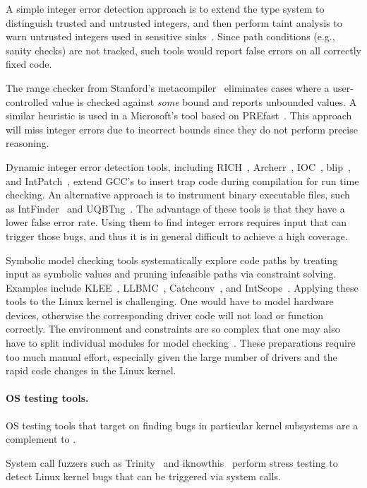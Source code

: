 A simple integer error detection approach is to extend the type
system to distinguish trusted and untrusted integers, and then
perform taint analysis to warn untrusted integers used in sensitive
sinks~\cite{cqual, lclint}.  Since path conditions (e.g., sanity
checks) are not tracked, such tools would report false errors on
all correctly fixed code.

The range checker from Stanford's metacompiler~\cite{range-checker}
eliminates cases where a user-controlled value is checked against
\emph{some} bound and reports unbounded values.  A similar heuristic
is used in a Microsoft's tool based on PREfast~\cite{prefast}.  This
approach will miss integer errors due to incorrect bounds since
they do not perform precise reasoning.

Dynamic integer error detection tools,
including
RICH~\cite{brumley:rich},
Archerr~\cite{archerr},
IOC~\cite{ioc},
blip~\cite{blip},
and
IntPatch~\cite{intpatch},
extend GCC's  to insert trap code during compilation for
run time checking.
%
An alternative approach is to instrument binary executable files,
such as IntFinder~\cite{intfinder} and UQBTng~\cite{uqbtng}.
%
The advantage of these tools is that they have a lower false error rate.
Using them to find integer errors requires input that can trigger
those bugs, and thus it is in general difficult to achieve a high
coverage.

Symbolic model checking tools systematically explore code paths by
treating input as symbolic values and pruning infeasible paths via
constraint solving.  Examples include
KLEE~\cite{cadar:klee},
LLBMC~\cite{llbmc},
Catchconv~\cite{molnar:catchconv},
and
IntScope~\cite{intscope}.
Applying these tools to the Linux kernel is challenging.  One would
have to model hardware devices, otherwise the corresponding driver
code will not load or function correctly.  The environment and
constraints are so complex that one may also have to split
individual modules for model checking~\cite{engler:vs}.  These
preparations require too much manual effort, especially given the
large number of drivers and the rapid code changes in the Linux
kernel.

\paragraph{OS testing tools.}
OS testing tools that target on finding bugs in particular kernel
subsystems are a complement to \sys.

System call fuzzers such as Trinity~\cite{trinity} and
iknowthis~\cite{iknowthis} perform stress testing to detect
Linux kernel bugs that can be triggered via system calls.


